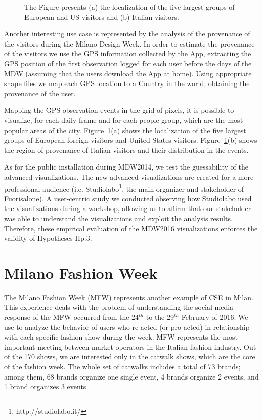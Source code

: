 \begin{figure}[p]
{}
\caption{ The Figure presents (a) the localization of the five largest groups of European and US visitors and (b) Italian visitors.}
\label{fig:gps_geo_2}
\end{figure}

Another interesting use case is represented by the analysis of the provenance of the visitors during the Milano Design Week.
In order to estimate the provenance of the visitors we use the GPS information collected by the App, extracting the GPS position of the first observation logged for each user before the days of the MDW (assuming that the users download the App at home). Using appropriate shape files we map each GPS location to a Country in the world, obtaining the provenance of the user.

Mapping the GPS observation \textsf{event}s in the \textsf{grid} of \textsf{pixel}s, it is possible to visualize, for each daily \textsf{frame} and for each people group, which are the most popular areas of the city. Figure~\ref{fig:gps_geo_2}(a) shows the localization of the five largest groups of European foreign visitors and United States visitors. Figure~\ref{fig:gps_geo_2}(b) shows the region of provenance of Italian visitors and their distribution in the events.

As for the public installation during MDW2014, we test the guessability of the advanced visualizations.
The new advanced visualizations are created for a more professional audience (i.e. Studiolabo\footnote{http://studiolabo.it/}, the main organizer and stakeholder of Fuorisalone).
A user-centric study we conducted observing how Studiolabo used the visualizations during a workshop, allowing us to affirm that our stakeholder was able to understand the visualizations and exploit the analysis results.
Therefore, these empirical evaluation of the MDW2016 visualizations enforces the validity of Hypotheses \textsf{Hp.3}.

\section{Milano Fashion Week} \label{sec:cs-mfw}
The Milano Fashion Week (MFW) represents another example of CSE in Milan. This experience deals with the problem of understanding the social media response of the MFW  occurred from the 24$^{th}$ to the 29$^{th}$ February of 2016.
We use \sti{} to analyze the behavior of users who re-acted (or pro-acted) in relationship with each specific fashion show during the week. MFW represents the most important meeting between market operators in the Italian fashion industry. Out of the 170 shows, we are interested only in the catwalk shows, which are the core of the fashion week. The whole set of catwalks includes a total of 73 brands; among them, 68 brands organize one single event, 4 brands organize 2 events, and 1 brand organizes 3 events. 

